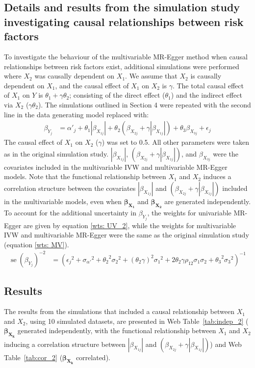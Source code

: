 \documentclass[a4paper,12pt]{article}
\DeclareMathOperator{\se}{se} %
\begin{document}
{\begin{bibunit}[wileyj]
\section{Details and results from the simulation study investigating causal relationships between risk factors}
\normalsize{To investigate the behaviour of the multivariable MR-Egger method when causal relationships between risk factors exist, additional simulations were performed where $X_2$ was causally dependent on $X_1$. We assume that $X_2$ is causally dependent on $X_1$, and the causal effect of $X_1$ on $X_2$ is $\gamma$. The total causal effect of $X_1$ on $Y$ is $\theta_1 + \gamma\theta_2$; consisting of the direct effect ($\theta_1$) and the indirect effect via $X_2$ ($\gamma\theta_2$). The simulations outlined in Section 4 were repeated with the second line in the data generating model replaced with:
\begin{align}
\beta_{Y_{j}} &= \alpha'_{j} + \theta_{1}|\beta_{X_{1j}}| + \theta_{2}(\beta_{X_{2j}} + \gamma|\beta_{X_{1j}}|) + \theta_{3}\beta_{X_{3j}} +\epsilon_{j} 
\end{align}
The causal effect of $X_1$ on $X_2$ ($\gamma$) was set to 0.5. All other parameters were taken as in the original simulation study. $|\beta_{X_{1j}}|$, $(\beta_{X_{2j}} + \gamma|\beta_{X_{1j}}|)$, and $\beta_{X_{3j}}$ were the covariates included in the multivariable IVW and multivariable MR-Egger models. Note that the functional relationship between $X_1$ and $X_2$ induces a correlation structure between the covariates $|\beta_{X_{1j}}|$ and $(\beta_{X_{2j}} + \gamma|\beta_{X_{1j}}|)$ included in the multivariable models, even when $\boldsymbol{\beta_{X_{1}}}$ and $\boldsymbol{\beta_{X_{2}}}$ are generated independently. To account for the additional uncertainty in $\beta_{Y_{j}}$, the weights for univariable MR-Egger are given by equation \ref{wts: UV_2}, while the weights for multivariable IVW and multivariable MR-Egger were the same as the original simulation study (equation \ref{wts: MV}).  
\begin{align}
\se(\beta_{Y_{j}})^{-2}&={({\epsilon_{j}}^{2}+{\sigma_{\alpha'}}^{2}+{\theta_{2}}^{2}{\sigma_{2}}^{2} + {(\theta_2\gamma)}^2{\sigma_1}^2+2\theta_{2}\gamma\rho_{12}\sigma_{1}\sigma_{2} + {\theta_{3}}^{2}{\sigma_{3}}^{2})}^{-1} \label{wts: UV_2}
\end{align}

\subsection*{Results}
The results from the simulations that included a causal relationship between $X_1$ and $X_2$, using 10 simulated datasets, are presented in Web Table~\ref{tab:indep_2} ($\boldsymbol{\beta_{X_{k}}}$ generated independently, with the functional relationship between $X_1$ and $X_2$ inducing a correlation structure between $|\beta_{X_{1j}}|$ and $(\beta_{X_{2j}} + \gamma|\beta_{X_{1j}}|)$) and Web Table~\ref{tab:cor_2} ($\boldsymbol{\beta_{X_{k}}}$ correlated).

}
\end{bibunit}}
\end{document}
